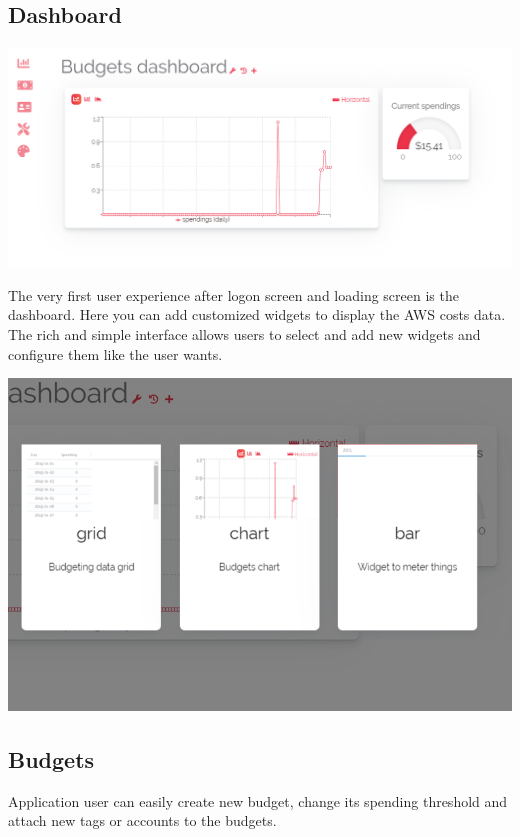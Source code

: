\documentclass[licencjacka,en]{thesisclass}
\begin{document}
    \subsection{Dashboard}
    
    \includegraphics[width=\textwidth] {imgs/screenshots/screen_dashboard.png}

    The very first user experience after logon screen and loading screen is the dashboard. Here you can add customized widgets to display the AWS costs data.
    The rich and simple interface allows users to select and add new widgets and configure them like the user wants.
    
    \includegraphics[width=\textwidth] {imgs/screenshots/screen_dashboard_add.png}
    
    \subsection{Budgets}
    
    Application user can easily create new budget, change its spending threshold and attach new tags or accounts to the budgets.
    
\end{document}
